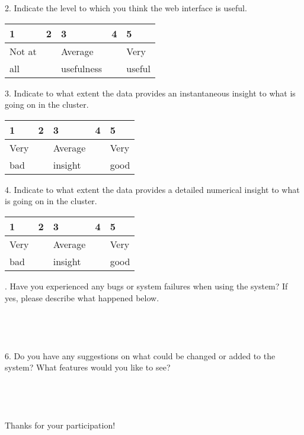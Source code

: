 \documentclass[12pt]{article}
\begin{document}
2. Indicate the level to which you think the web interface is useful.
\vspace{-4ex}
\begin{center}
\begin{tabular}{
|m{4em}|m{4em}|m{4em}|m{4em}|m{4em}| }
\hline
 1 & 2 & 3 & 4 & 5 \\ 
 \hline
 Not at &&Average&& Very\\
 all &&usefulness&& useful\\
  \hline
\end{tabular}
\end{center}

3. Indicate to what extent the data provides an instantaneous insight to what is going on in the cluster.
\vspace{-4ex}
\begin{center}
\begin{tabular}{
|m{4em}|m{4em}|m{4em}|m{4em}|m{4em}| }
\hline
 1 & 2 & 3 & 4 & 5 \\ 
 \hline
 Very &&Average&& Very\\
 bad &&insight&& good\\
  \hline
\end{tabular}
\end{center}

4. Indicate to what extent the data provides a detailed numerical insight to what is going on in the cluster.
\vspace{-4ex}
\begin{center}
\begin{tabular}{
|m{4em}|m{4em}|m{4em}|m{4em}|m{4em}| }
\hline
 1 & 2 & 3 & 4 & 5 \\ 
 \hline
 Very &&Average&& Very\\
 bad &&insight&& good\\
  \hline
\end{tabular}
\end{center}
. Have you experienced any bugs or system failures when using the system? If yes, please describe what happened below.\\\\\\\\\\

6. Do you have any suggestions on what could be changed or added to the system? What features would you like to see?\\\\\\\\\\

Thanks for your participation!
\end{document}
